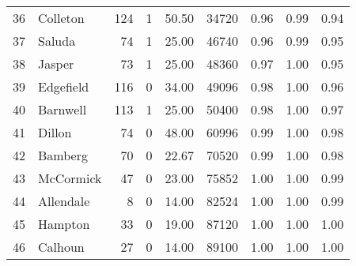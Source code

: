 \begin{tabular}{llrrrrrrr}
36 &      Colleton &   124 &      1 &  50.50 &         34720 &       0.96 &        0.99 &        0.94 \\
37 &        Saluda &    74 &      1 &  25.00 &         46740 &       0.96 &        0.99 &        0.95 \\
38 &        Jasper &    73 &      1 &  25.00 &         48360 &       0.97 &        1.00 &        0.95 \\
39 &     Edgefield &   116 &      0 &  34.00 &         49096 &       0.98 &        1.00 &        0.96 \\
40 &      Barnwell &   113 &      1 &  25.00 &         50400 &       0.98 &        1.00 &        0.97 \\
41 &        Dillon &    74 &      0 &  48.00 &         60996 &       0.99 &        1.00 &        0.98 \\
42 &       Bamberg &    70 &      0 &  22.67 &         70520 &       0.99 &        1.00 &        0.98 \\
43 &     McCormick &    47 &      0 &  23.00 &         75852 &       1.00 &        1.00 &        0.99 \\
44 &     Allendale &     8 &      0 &  14.00 &         82524 &       1.00 &        1.00 &        0.99 \\
45 &       Hampton &    33 &      0 &  19.00 &         87120 &       1.00 &        1.00 &        1.00 \\
46 &       Calhoun &    27 &      0 &  14.00 &         89100 &       1.00 &        1.00 &        1.00 \\
\bottomrule
\end{tabular}
